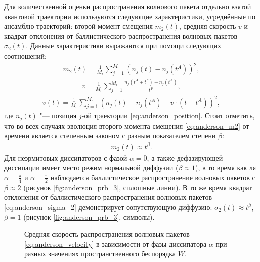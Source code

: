 Для количественной оценки распространения волнового пакета отдельно взятой квантовой траектории используются следующие характеристики, усреднённые по ансамблю траекторий: второй момент смещения \(m_2(t)\), средняя скорость \(v\) и квадрат отклонения от баллистического распространения волновых пакетов \(\sigma_2(t)\). Данные характеристики выражаются при помощи следующих соотношений:
\begin{equation}
\label{eq:anderson_m2}
\begin{gathered}
m_2(t) = \frac{1}{M_r} \sum_{j=1}^{M_r} \left( n_j(t) - n_j(t^A) \right)^2,
\end{gathered}
\end{equation}
\begin{equation}
\label{eq:anderson_velocity}
\begin{gathered}
v = \frac{1}{M_r} \sum_{j=1}^{M_r} \frac{n_j(t^A + t^F) - n_j(t^A)}{t^F},
\end{gathered}
\end{equation}
\begin{equation}
\label{eq:anderson_sigma_2}
\begin{gathered}
v(t) = \frac{1}{M_r} \sum_{j=1}^{M_r} \left( n_j(t) - n_j(t^A) - v \cdot (t-t^A) \right)^2,
\end{gathered}
\end{equation}
где \(n_j(t)\) "--- позиция \(j\)-ой траектории \cref{eq:anderson_position}. Стоит отметить, что во всех случаях эволюция второго момента смещения \cref{eq:anderson_m2} от времени является степенным законом с разным показателем степени \(\beta\):
\begin{equation}
\label{eq:anderson_m2_fit}
\begin{gathered}
m_2(t) \approx t^\beta .
\end{gathered}
\end{equation}
Для неэрмитовых диссипаторов с фазой \(\alpha=0\), а также дефазирующей диссипации имеет место режим нормальной диффузии (\(\beta \approx 1\)), в то время как ля \(\alpha=\frac{\pi}{4}\) и \(\alpha=\frac{\pi}{2}\) наблюдается баллистическое распространение волновых пакетов с \(\beta \approx 2\) (рисунок \cref{fig:anderson_prb_3}, сплошные линии). В то же время квадрат отклонения от баллистического распространения волновых пакетов \cref{eq:anderson_sigma_2} демонстрирует сопутствующую диффузию: \(\sigma_2(t) \approx t^\beta\), \(\beta=1\) (рисунок \cref{fig:anderson_prb_3}, символы).

\begin{figure}[h]
	\caption{
		Средняя скорость распространения волновых пакетов \cref{eq:anderson_velocity} в зависимости от фазы диссипатора \(\alpha\) при разных значениях пространственного беспорядка \(W\).
	}
	\label{fig:anderson_prb_4}
\end{figure}

